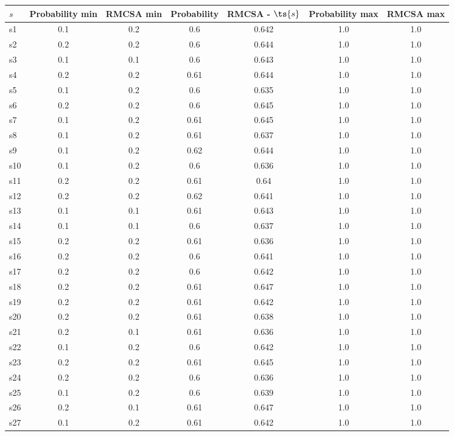 \documentclass{article}
\begin{document}
\noindent\begin{tabular}{|l|c|c|c|c|c|c|}
\hline
$s$& Probability min & RMCSA min & Probability & RMCSA - $\ts{s}$ & Probability max & RMCSA max\\
\hline
s1 &0.1 & 0.2 & 0.6 & 0.642 & 1.0 & 1.0\\
\hline
s2 &0.2 & 0.2 & 0.6 & 0.644 & 1.0 & 1.0\\
\hline
s3 &0.1 & 0.1 & 0.6 & 0.643 & 1.0 & 1.0\\
\hline
s4 &0.2 & 0.2 & 0.61 & 0.644 & 1.0 & 1.0\\
\hline
s5 &0.1 & 0.2 & 0.6 & 0.635 & 1.0 & 1.0\\
\hline
s6 &0.2 & 0.2 & 0.6 & 0.645 & 1.0 & 1.0\\
\hline
s7 &0.1 & 0.2 & 0.61 & 0.645 & 1.0 & 1.0\\
\hline
s8 &0.1 & 0.2 & 0.61 & 0.637 & 1.0 & 1.0\\
\hline
s9 &0.1 & 0.2 & 0.62 & 0.644 & 1.0 & 1.0\\
\hline
s10 &0.1 & 0.2 & 0.6 & 0.636 & 1.0 & 1.0\\
\hline
s11 &0.2 & 0.2 & 0.61 & 0.64 & 1.0 & 1.0\\
\hline
s12 &0.2 & 0.2 & 0.62 & 0.641 & 1.0 & 1.0\\
\hline
s13 &0.1 & 0.1 & 0.61 & 0.643 & 1.0 & 1.0\\
\hline
s14 &0.1 & 0.1 & 0.6 & 0.637 & 1.0 & 1.0\\
\hline
s15 &0.2 & 0.2 & 0.61 & 0.636 & 1.0 & 1.0\\
\hline
s16 &0.2 & 0.2 & 0.6 & 0.641 & 1.0 & 1.0\\
\hline
s17 &0.2 & 0.2 & 0.6 & 0.642 & 1.0 & 1.0\\
\hline
s18 &0.2 & 0.2 & 0.61 & 0.647 & 1.0 & 1.0\\
\hline
s19 &0.2 & 0.2 & 0.61 & 0.642 & 1.0 & 1.0\\
\hline
s20 &0.2 & 0.2 & 0.61 & 0.638 & 1.0 & 1.0\\
\hline
s21 &0.2 & 0.1 & 0.61 & 0.636 & 1.0 & 1.0\\
\hline
s22 &0.1 & 0.2 & 0.6 & 0.642 & 1.0 & 1.0\\
\hline
s23 &0.2 & 0.2 & 0.61 & 0.645 & 1.0 & 1.0\\
\hline
s24 &0.2 & 0.2 & 0.6 & 0.636 & 1.0 & 1.0\\
\hline
s25 &0.1 & 0.2 & 0.6 & 0.639 & 1.0 & 1.0\\
\hline
s26 &0.2 & 0.1 & 0.61 & 0.647 & 1.0 & 1.0\\
\hline
s27 &0.1 & 0.2 & 0.61 & 0.642 & 1.0 & 1.0\\

\end{tabular}
\end{document}
